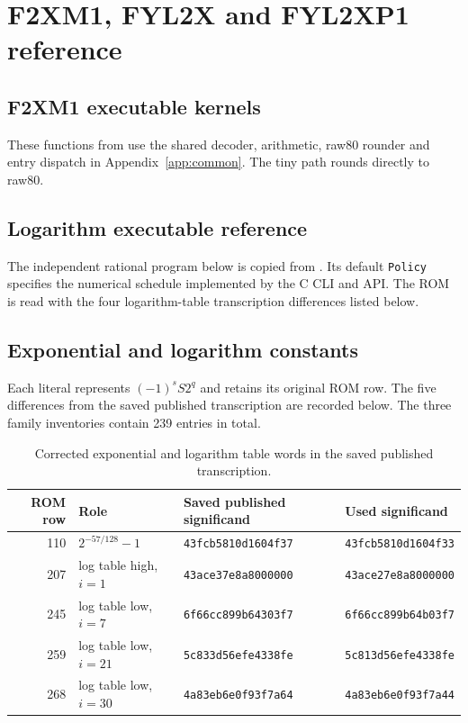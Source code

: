 \documentclass[11pt]{article}
\newcommand{\ins}[1]{\texttt{#1}}
\newcommand{\hex}[1]{\texttt{#1}}
\begin{document}
\clearpage
\section{F2XM1, FYL2X and FYL2XP1 reference}
\label{app:explog}

\subsection{F2XM1 executable kernels}
These functions from  use the shared
decoder, arithmetic, raw80 rounder and entry dispatch in
Appendix~\ref{app:common}. The tiny path rounds directly to raw80.


\subsection{Logarithm executable reference}
\label{app:log}
The independent rational program below is copied from
. Its default \ins{Policy} specifies the numerical
schedule implemented by the C CLI and API. The ROM is read with the four
logarithm-table transcription differences listed below.


\subsection{Exponential and logarithm constants}
\label{app:explog-constants}
Each literal represents $(-1)^s S2^q$ and retains its original ROM row.
The five differences from the saved published transcription are recorded
below. The three family inventories contain 239 entries in total.

\begin{table}[ht]
\centering\footnotesize
\begin{tabular}{@{}rlll@{}}
\toprule
ROM row & Role & Saved published significand & Used significand\\
\midrule
110 & $2^{-57/128}-1$ & \hex{43fcb5810d1604f37} & \hex{43fcb5810d1604f33}\\
207 & log table high, $i=1$ & \hex{43ace37e8a8000000} & \hex{43ace27e8a8000000}\\
245 & log table low, $i=7$ & \hex{6f66cc899b64303f7} & \hex{6f66cc899b64b03f7}\\
259 & log table low, $i=21$ & \hex{5c833d56efe4338fe} & \hex{5c813d56efe4338fe}\\
268 & log table low, $i=30$ & \hex{4a83eb6e0f93f7a64} & \hex{4a83eb6e0f93f7a44}\\
\bottomrule
\end{tabular}
\caption{Corrected exponential and logarithm table words in the saved published transcription.}
\end{table}
\end{document}
